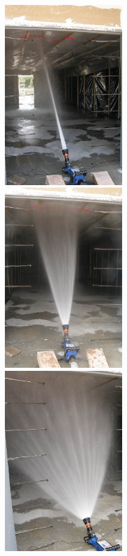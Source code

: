 \documentclass[12pt,oneside]{book}
\begin{document}
\begin{figure}[!ht]
	\minipage{2.15in}
	\begin{center}
		\includegraphics[width=2in]{../Figures/Pictures/SS_near}
	\end{center} 
	\endminipage \hfill
	\minipage{2.15in}
	\begin{center}
		\includegraphics[width=2in]{../Figures/Pictures/NF_near}
	\end{center}
	\endminipage \hfill
	\minipage{2.15in}
	\begin{center}
		\includegraphics[width=2in]{../Figures/Pictures/WF_near}

\end{center}
\end{figure}
\end{document}
